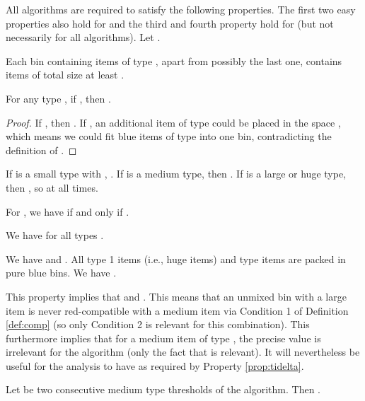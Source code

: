 All {\EHarm} algorithms are required to satisfy the following properties.
The first two easy properties also hold for {\SuperH} and the third and fourth property hold for \Hpp{} (but not necessarily for all \SuperH{} algorithms).
Let .
\begin{aproperty}
	\label{prop:nextfit}
	Each bin containing items of type , apart from possibly the last one, contains items of total size at least .
\end{aproperty}
\begin{aproperty}\label{prop:leaves-needs}
	For any type , if , then 
	. \end{aproperty}
\begin{proof}
If , then .
If , an additional item of type  could be placed in the space
, which means we could fit  blue items of type  into one bin,
contradicting the definition of .
\end{proof}

\begin{aproperty}
	\label{prop:redspace}
	If  is a small type with , .
	If  is a medium type, then
	. If  is a large or huge type, then , so  at all times.
\end{aproperty}
\begin{aproperty}
	\label{prop:tidelta}
	For , we have  if and only if .
\end{aproperty}


\begin{aproperty}
	\label{prop:redfrac}
	We have  for all types .
\end{aproperty}


\begin{aproperty}
	\label{prop:type12N}
	We have  and .
	All type 1 items (i.e., huge items) and type  items are packed in pure blue bins.
	We have .
\end{aproperty}

This property implies that  and .
This means that an unmixed bin with a large item is never red-compatible
with a medium item via Condition 1 of Definition \ref{def:comp}
(so only Condition 2 is relevant for this combination).
This furthermore implies that for a medium item of type , the precise value
 is irrelevant for the algorithm (only the fact that  is relevant).
It will nevertheless be useful for the analysis to have 
as required by Property \ref{prop:tidelta}.

\begin{aproperty}\label{prop:q1unique}
	Let  be two consecutive medium type thresholds of the algorithm. Then .
\end{aproperty}

